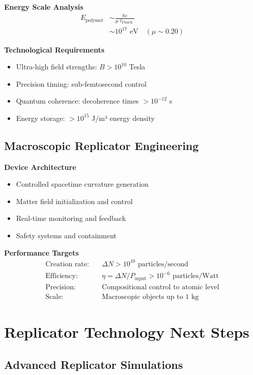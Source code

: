 \documentclass[11pt]{article}
\begin{document}
\textbf{Energy Scale Analysis}
\begin{align}
E_{\text{polymer}} &\sim \frac{\hbar c}{\mu \ell_{\text{Planck}}} \\
&\sim 10^{17} \text{ eV} \quad (\mu \sim 0.20)
\end{align}

\textbf{Technological Requirements}
\begin{itemize}
\item Ultra-high field strengths: $B > 10^{10}$ Tesla
\item Precision timing: sub-femtosecond control
\item Quantum coherence: decoherence times $> 10^{-12}$ s
\item Energy storage: $> 10^{15}$ J/m³ energy density
\end{itemize}

\subsection{Macroscopic Replicator Engineering}

\textbf{Device Architecture}
\begin{itemize}
\item Controlled spacetime curvature generation
\item Matter field initialization and control
\item Real-time monitoring and feedback
\item Safety systems and containment
\end{itemize}

\textbf{Performance Targets}
\begin{align}
\text{Creation rate:} &\quad \Delta N > 10^{10} \text{ particles/second} \\
\text{Efficiency:} &\quad \eta = \Delta N / P_{\text{input}} > 10^{-6} \text{ particles/Watt} \\
\text{Precision:} &\quad \text{Compositional control to atomic level} \\
\text{Scale:} &\quad \text{Macroscopic objects up to 1 kg}
\end{align}

\section{Replicator Technology Next Steps}

\subsection{Advanced Replicator Simulations}
\end{document}
